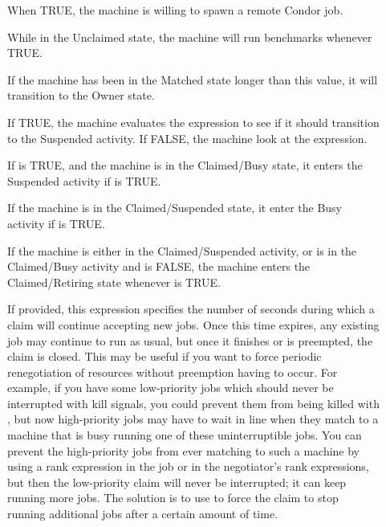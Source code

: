\begin{description}
  
\item[] When TRUE, the machine is willing to spawn
  a remote Condor job.
  
\item[] While in the Unclaimed state, the machine
  will run benchmarks whenever TRUE.
  
\item[] If the machine has been in the Matched
  state longer than this value, it will transition to the Owner state.
  
\item[] If TRUE, the machine evaluates
  the  expression to see if it should transition to the
  Suspended activity.  If FALSE, the machine look at
  the  expression.
  
\item[] If  is TRUE, and the machine
  is in the Claimed/Busy state, it enters the Suspended activity
  if  is TRUE.
  
\item[] If the machine is in the Claimed/Suspended
  state, it enter the Busy activity if  is TRUE.
  
\item[] If the machine is either in the Claimed/Suspended
  activity, or is in the Claimed/Busy activity and
   is FALSE, the machine enters the Claimed/Retiring
  state whenever  is TRUE. 

\item[] If provided, this expression specifies
the number of seconds during which a claim will continue accepting new
jobs.  Once this time expires, any existing job may continue to run as
usual, but once it finishes or is preempted, the claim is closed.
This may be useful if you want to force periodic renegotiation of
resources without preemption having to occur.  For example, if you
have some low-priority jobs which should never be interrupted with
kill signals, you could prevent them from being killed with
, but now high-priority jobs may have to
wait in line when they match to a machine that is busy running one of
these uninterruptible jobs.  You can prevent the high-priority jobs
from ever matching to such a machine by using a rank expression in the
job or in the negotiator's rank expressions, but then the low-priority
claim will never be interrupted; it can keep running more jobs.  The
solution is to use  to force the claim to stop
running additional jobs after a certain amount of time.


\end{description}
